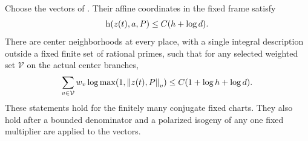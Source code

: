 \begin{proposition}\label{prop:dr-size}
Choose the vectors of .  Their affine
coordinates in the fixed frame satisfy
\begin{equation}\label{eq:dr-global}
 \mathrm h\!\left(z(t),a,P\right)\le C(h+\log d).
\end{equation}
There are center neighborhoods at every place, with a single integral
description outside a fixed finite set of rational primes, such that
for any selected weighted set $\mathcal V$ on the actual center branches,
\begin{equation}\label{eq:dr-local}
 \sum_{v\in\mathcal V}w_v
       \log\max(1,\left\lVert z(t),P\right\rVert_v)
       \le C(1+\log h+\log d).
\end{equation}
These statements hold for the finitely many conjugate fixed charts.
They also hold after a bounded denominator and a polarized isogeny
of any one fixed multiplier are applied to the vectors.
\end{proposition}

